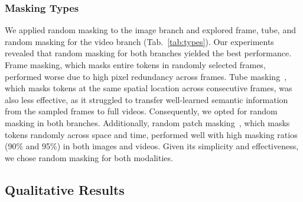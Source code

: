 \subsubsection{Masking Types} 

\begin{table}[h!]
\centering
{}

\caption{Performance comparison of various masking strategies on the IN-1K SSv2 dataset using Acc@1, highlighting the impact of different combinations of image and video branches.}
\label{tab:types}

\end{table}
We applied random masking to the image branch and explored frame, tube, and random masking for the video branch (Tab.~\ref{tab:types}). Our experiments revealed that random masking for both branches yielded the best performance. Frame masking, which masks entire tokens in randomly selected frames, performed worse due to high pixel redundancy across frames. Tube masking~\cite{tong2022videomae}, which masks tokens at the same spatial location across consecutive frames, was also less effective, as it struggled to transfer well-learned semantic information from the sampled frames to full videos. Consequently, we opted for random masking in both branches. Additionally, random patch masking~\cite{feichtenhofer2022masked}, which masks tokens randomly across space and time, performed well with high masking ratios (90\% and 95\%) in both images and videos. Given its simplicity and effectiveness, we chose random masking for both modalities.






\subsection{Qualitative Results}
\label{sec:visualize}


